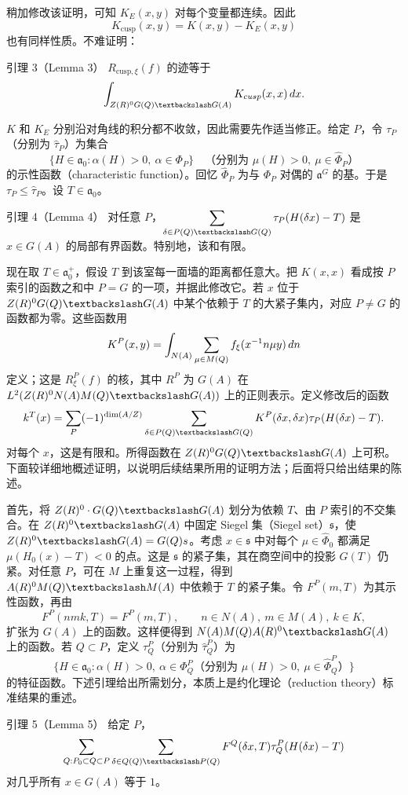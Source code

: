 稍加修改该证明，可知 $K_E(x,y)$ 对每个变量都连续。因此
\[
 K_{\mathrm{cusp}}(x,y)=K(x,y)-K_E(x,y)
\]
也有同样性质。不难证明：
\begin{originaltheorem}{引理 3（Lemma 3）}
$R_{\mathrm{cusp},\xi}(f)$ 的迹等于
\[
 \int_{Z(\R)^0G(\Q)\backslash G(A)}K_{\mathrm{cusp}}(x,x)\,dx.
\]
\end{originaltheorem}

$K$ 和 $K_E$ 分别沿对角线的积分都不收敛，因此需要先作适当修正。给定 $P$，令 $\tau_P$（分别为 $\widehat\tau_P$）为集合
\[
 \{H\in\mathfrak a_0:\alpha(H)>0,\ \alpha\in\Phi_P\}
 \quad\text{（分别为 }\mu(H)>0,\ \mu\in\widehat\Phi_P\text{）}
\]
的示性函数（characteristic function）。回忆 $\widehat\Phi_P$ 为与 $\Phi_P$ 对偶的 $\mathfrak a^G$ 的基。于是 $\tau_P\le\widehat\tau_P$。设 $T\in\mathfrak a_0$。
\begin{originaltheorem}{引理 4（Lemma 4）}
对任意 $P$，$\displaystyle\sum_{\delta\in P(\Q)\backslash G(\Q)}
\widehat\tau_P(H(\delta x)-T)$ 是 $x\in G(A)$ 的局部有界函数。特别地，该和有限。
\end{originaltheorem}

现在取 $T\in\mathfrak a_0^+$，假设 $T$ 到该室每一面墙的距离都任意大。把 $K(x,x)$ 看成按 $P$ 索引的函数之和中 $P=G$ 的一项，并据此修改它。若 $x$ 位于 $Z(\R)^0G(\Q)\backslash G(A)$ 中某个依赖于 $T$ 的大紧子集内，对应 $P\ne G$ 的函数都为零。这些函数用
\[
 K^P(x,y)=\int_{N(A)}\sum_{\mu\in M(Q)}f_\xi(x^{-1}n\mu y)\,dn
\]
定义；这是 $R_\xi^P(f)$ 的核，其中 $R^P$ 为 $G(A)$ 在
$L^2(Z(\R)^0N(A)M(\Q)\backslash G(A))$ 上的正则表示。定义修改后的函数
\[
 k^T(x)=\sum_P(-1)^{\dim(A/Z)}
 \sum_{\delta\in P(\Q)\backslash G(\Q)}
 K^P(\delta x,\delta x)\widehat\tau_P(H(\delta x)-T).
\]
对每个 $x$，这是有限和。所得函数在 $Z(\R)^0G(\Q)\backslash G(A)$ 上可积。下面较详细地概述证明，以说明后续结果所用的证明方法；后面将只给出结果的陈述。

首先，将 $Z(\R)^0\cdot G(\Q)\backslash G(A)$ 划分为依赖 $T$、由 $P$ 索引的不交集合。在 $Z(\R)^0\backslash G(A)$ 中固定 Siegel 集（Siegel set）$\mathfrak s$，使
$Z(\R)^0\backslash G(A)=G(\Q)\mathfrak s$。考虑 $x\in\mathfrak s$ 中对每个
$\mu\in\widehat\Phi_0$ 都满足 $\mu(H_0(x)-T)<0$ 的点。这是 $\mathfrak s$ 的紧子集，其在商空间中的投影 $G(T)$ 仍紧。对任意 $P$，可在 $M$ 上重复这一过程，得到
$A(\R)^0M(\Q)\backslash M(A)$ 中依赖于 $T$ 的紧子集。令 $F^P(m,T)$ 为其示性函数，再由
\[
 F^P(nmk,T)=F^P(m,T),\qquad n\in N(A),\ m\in M(A),\ k\in K,
\]
扩张为 $G(A)$ 上的函数。这样便得到 $N(A)M(\Q)A(\R)^0\backslash G(A)$ 上的函数。若 $Q\subset P$，定义 $\tau_Q^P$（分别为 $\widehat\tau_Q^P$）为
\[
 \{H\in\mathfrak a_0:\alpha(H)>0,\ \alpha\in\Phi_Q^P
 \text{（分别为 }\mu(H)>0,\ \mu\in\widehat\Phi_Q^P\text{）}\}
\]
的特征函数。下述引理给出所需划分，本质上是约化理论（reduction theory）标准结果的重述。
\begin{originaltheorem}{引理 5（Lemma 5）}
给定 $P$，
\[
 \sum_{Q:P_0\subset Q\subset P}\sum_{\delta\in Q(\Q)\backslash P(\Q)}
 F^Q(\delta x,T)\tau_Q^P(H(\delta x)-T)
\]
对几乎所有 $x\in G(A)$ 等于 $1$。
\end{originaltheorem}

